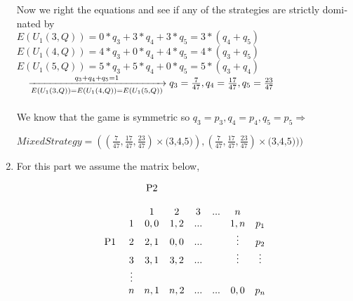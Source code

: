 \begin{enumerate}
\begin{latin}
\begin{center}
                           \end{center}
                           Now we right the equations and see if any of the strategies are strictly dominated by \\
                           $E(U_1(3,Q)) = 0 * q_3 + 3 * q_4 + 3 * q_5 = 3 * (q_4 + q_5)$\\
                           $E(U_1(4,Q)) = 4 * q_3 + 0 * q_4 + 4 * q_5 = 4 * (q_3 + q_5) $\\
                           $E(U_1(5,Q)) = 5 * q_3 + 5 * q_4 + 0 * q_5 = 5 * (q_3 + q_4)$\\
                           $\hspace{4mm} \xrightarrow[E(U_1(3,Q)) = E(U_1(4,Q))=E(U_1(5,Q))]{q_3+q_4+q_5 = 1} q_3 = \frac{7}{47},q_4=\frac{17}{47},q_5=\frac{23}{47}$ \\
                          \\ We know that the game is symmetric so $q_3 = p_3,q_4=p_4,q_5=p_5 \Rightarrow
                           $\begin{center}$ Mixed Strategy = ((\frac{7}{47},\frac{17}{47},\frac{23}{47})\times\text{(3,4,5)}),(\frac{7}{47},\frac{17}{47},\frac{23}{47})\times\text{(3,4,5)}))$ \end{center}
            \end{latin}
            \item \phantom{text}
            \begin{latin}
                For this part we assume the matrix below,
                \begin{center}
                    \begin{equation*}
                                \begin{matrix}
                                      & & \text{P2}                  \\ \\ 
                                      & & 1 & 2 & 3 & ... & n            \\
                                    & 1 & 0,0 & 1,2 & ... & & 1,n  & p_1         \\
                                    \text{P1} \hspace{1mm}& 2 & 2,1 & 0,0 & ... &  & \vdots & p_2   \\
                                    & 3 & 3,1 & 3,2 & ... & & \vdots & \vdots\\
                                    & \vdots \\
                                    & n & n,1 & n,2 & ... & ... & 0,0  & p_n \\

\end{matrix}
\end{equation*}
\end{center}
\end{latin}
\end{enumerate}
